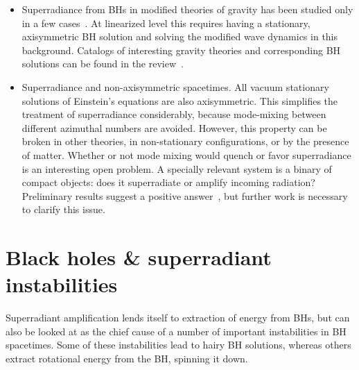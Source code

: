 \documentclass[11pt]{article}
\numberwithin{equation}{section} %
\begin{document}
\begin{itemize}
\item Superradiance from BHs in modified theories of gravity has been studied only in a few 
cases~\cite{Wondrak:2018fza,Frolov:2018bak,Khodadi:2020cht}. At linearized level this requires having a stationary, axisymmetric BH 
solution and solving the modified wave dynamics in this background. Catalogs of interesting gravity theories and 
corresponding BH solutions can be found in the review~\cite{Berti:2015itd}.

\item Superradiance and non-axisymmetric spacetimes. All vacuum stationary solutions of Einstein's equations are also 
axisymmetric. This simplifies the treatment of superradiance considerably, because mode-mixing between different 
azimuthal numbers are avoided. However, this property can be broken in other theories, in non-stationary 
configurations, or by the presence of matter. Whether or not mode mixing would quench or favor superradiance is 
an interesting open problem. A specially relevant system is a binary of compact objects: does it superradiate or amplify incoming radiation? Preliminary results suggest a positive answer~\cite{Bernard:2019nkv,Wong:2019kru,Wong:2020qom}, but further work is necessary to clarify this issue.
\end{itemize}



\clearpage
\newpage
\section{Black holes \& superradiant instabilities}\label{sec:bombs}
Superradiant amplification lends itself to extraction of energy from BHs, but can also
be looked at as the chief cause of a number of important instabilities in BH spacetimes.
Some of these instabilities lead to hairy BH solutions, whereas others extract rotational
energy from the BH, spinning it down.
\end{document}
